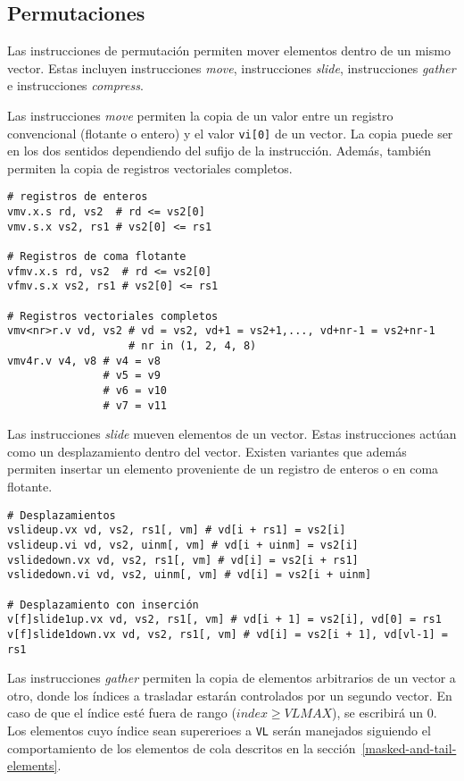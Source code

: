 \subsection{Permutaciones}
Las instrucciones de permutación permiten mover elementos dentro de un mismo
vector. Estas incluyen instrucciones \textit{move}, instrucciones
\textit{slide}, instrucciones \textit{gather} e instrucciones
\textit{compress}.

Las instrucciones \textit{move} permiten la copia de un valor entre un registro
convencional (flotante o entero) y el valor \texttt{vi[0]} de un vector. La
copia puede ser en los dos sentidos dependiendo del sufijo de la instrucción.
Además, también permiten la copia de registros vectoriales completos.

\begin{lstlisting}
# registros de enteros
vmv.x.s rd, vs2  # rd <= vs2[0]
vmv.s.x vs2, rs1 # vs2[0] <= rs1

# Registros de coma flotante
vfmv.x.s rd, vs2  # rd <= vs2[0]
vfmv.s.x vs2, rs1 # vs2[0] <= rs1

# Registros vectoriales completos
vmv<nr>r.v vd, vs2 # vd = vs2, vd+1 = vs2+1,..., vd+nr-1 = vs2+nr-1
                   # nr in (1, 2, 4, 8)
vmv4r.v v4, v8 # v4 = v8 
               # v5 = v9
               # v6 = v10
               # v7 = v11
\end{lstlisting}

Las instrucciones \textit{slide} mueven elementos de un vector. Estas instrucciones
actúan como un desplazamiento dentro del vector. Existen variantes que además
permiten insertar un elemento proveniente de un registro de enteros o en coma
flotante.

\begin{lstlisting}
# Desplazamientos
vslideup.vx vd, vs2, rs1[, vm] # vd[i + rs1] = vs2[i]
vslideup.vi vd, vs2, uinm[, vm] # vd[i + uinm] = vs2[i]
vslidedown.vx vd, vs2, rs1[, vm] # vd[i] = vs2[i + rs1]
vslidedown.vi vd, vs2, uinm[, vm] # vd[i] = vs2[i + uinm]

# Desplazamiento con inserción
v[f]slide1up.vx vd, vs2, rs1[, vm] # vd[i + 1] = vs2[i], vd[0] = rs1
v[f]slide1down.vx vd, vs2, rs1[, vm] # vd[i] = vs2[i + 1], vd[vl-1] = rs1
\end{lstlisting}

Las instrucciones \textit{gather} permiten la copia de elementos arbitrarios de
un vector a otro, donde los índices a trasladar estarán controlados por un
segundo vector. En caso de que el índice esté fuera de rango ($index \ge
VLMAX$), se escribirá un 0. Los elementos cuyo índice sean supererioes a
\texttt{VL} serán manejados siguiendo el comportamiento de los elementos de
cola descritos en la sección~\ref{masked-and-tail-elements}.

